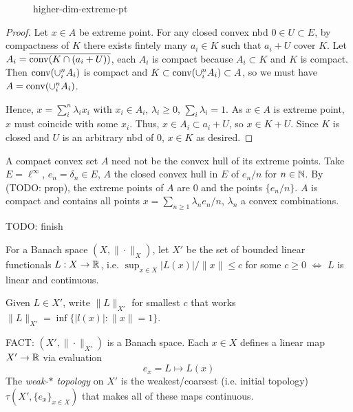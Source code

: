 \begin{figure}[ht]
    \centering
    \caption{higher-dim-extreme-pt}
    \label{fig:higher-dim-extreme-pt}
\end{figure}

\begin{proof}
  Let $x \in A$ be extreme point. For any closed convex nbd $0 \in U \subset E$,
  by compactness of $K$
  there exists fintely many $a_i \in K$ such that $a_i + U$ cover $K$.
  Let $A_i = \overline{\operatorname{conv}(K \cap (a_i + U))}$, each $A_i$ is compact
  because $A_i \subset K$ and $K$ is compact. 
  Then $\operatorname{conv}(\cup_i^n A_i)$ is compact and
  $K \subset \operatorname{conv}(\cup_i^n A_i) \subset A$, so we must have
  $A = \operatorname{conv}(\cup_i^n A_i)$.

  Hence, $x = \sum_i^n \lambda_i x_i$ with $x_i \in A_i$, $\lambda_i \geq 0$,
  $\sum_i \lambda_i = 1$. As $x \in A$ is extreme point, $x$ must
  coincide with some $x_i$. Thus, $x \in A_i \subset a_i + U$,
  so $x \in K + U$.
  Since $K$ is closed and $U$ is an arbitrary nbd of $0$, $x \in K$
  as desired.
\end{proof}

\begin{example}
  A compact convex set $A$ need not be the convex hull of its extreme points.
  Take $E = \ell^\infty$, $e_n = \delta_n \in E$, $A$ the closed
  convex hull in $E$ of $e_n / n$ for $n \in \mathbb{N}$.
  By (TODO: prop), the extreme points
  of $A$ are $0$ and the points $\{e_n / n\}$.
  $A$ is compact and contains all points $x = \sum_{n \geq 1} \lambda_n e_n / n$,
  $\lambda_n$ a convex combinations.

  TODO: finish
\end{example}

\begin{definition}
  For a Banach space $(X, \|\cdot\|_X)$, let $X'$ be the set of bounded
  linear functionals $L : X \to \mathbb{R}$, i.e.
  $\sup_{x \in X} \lvert L(x) \rvert / \|x\| \leq c$ for some $c \geq 0$
  $\iff$ $L$ is linear and continuous.

  Given $L \in X'$, write $\|L\|_{X'}$ for smallest $c$
  that works $\|L\|_{X'} = \inf \{\lvert l(x) \rvert : \|x\| = 1\}$.

  FACT: $(X', \|\cdot\|_{X'})$ is a Banach space.
  Each $x \in X$ defines a linear map $X' \to \mathbb{R}$ via evaluation
  \[
    e_x = L \mapsto L(x)
  \]
  The \emph{weak-$\ast$ topology} on $X'$ is the weakest/coarsest
  (i.e. initial topology) $\tau(X', \{e_x\}_{x \in X})$ that makes all of these 
  maps continuous.
\end{definition}


